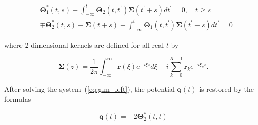 \begin{equation}
\begin{aligned}
&\mathbf{\Theta}_{1}^{*}(t, s)+\int_{-\infty}^{t} \mathbf{\Theta}_{2}\left(t, t^{\prime}\right) \mathbf{\Sigma}\left(t^{\prime}+s\right) d t^{\prime}=0, \quad t \geq s \\
&\mp \mathbf{\Theta}_{2}^{*}(t, s)+\mathbf{\Sigma}(t+s)+\int_{-\infty}^{t} \mathbf{\Theta}_{1}\left(t, t^{\prime}\right) \mathbf{\Sigma}\left(t^{\prime}+s\right) d t^{\prime}=0
\end{aligned}
\label{eq:glm_left}
\end{equation}

where 2-dimensional kernels are defined for all real $t$ by

\begin{equation}
\mathbf{\Sigma}(z)=\frac{1}{2 \pi} \int_{-\infty}^{\infty} \mathbf{r}(\xi) e^{-i \xi z} d \xi-i \sum_{k=0}^{K-1} \mathbf{r}_{k} e^{-i \xi_{k} z}{.}
\end{equation}


After solving the system~(\ref{eq:glm_left}), the potential $\mathbf{q}(t)$ is restored by the formulas

$$
\mathbf{q}(t)=-2 \mathbf{\Theta}_{2}^{*}(t, t)
$$


